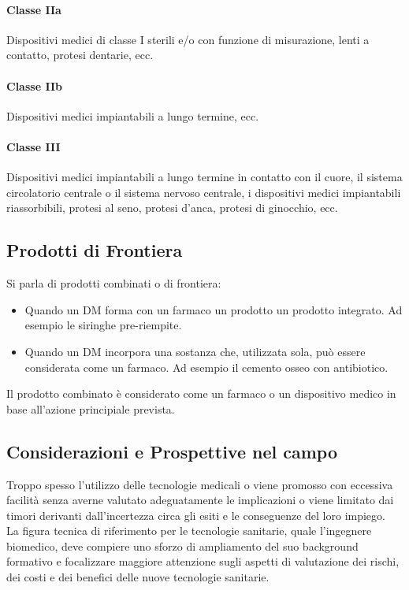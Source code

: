 \documentclass[a4paper]{article}
\begin{document}
\paragraph{Classe IIa}
Dispositivi medici di classe I sterili e/o con funzione di misurazione, lenti a 
contatto, protesi dentarie, ecc.
\paragraph{Classe IIb}
Dispositivi medici impiantabili a lungo termine, ecc.
\paragraph{Classe III}
Dispositivi medici impiantabili a lungo termine in contatto con il cuore, il 
sistema circolatorio centrale o il sistema nervoso centrale, i dispositivi 
medici impiantabili riassorbibili, protesi al seno, protesi d'anca, protesi
di ginocchio, ecc.
\subsection{Prodotti di Frontiera}
Si parla di prodotti combinati o di frontiera:
\begin{itemize}
    \item Quando un DM forma con un farmaco un prodotto un prodotto integrato.
    Ad esempio le siringhe pre-riempite.
    \item Quando un DM incorpora una sostanza che, utilizzata sola, può essere
    considerata come un farmaco. Ad esempio il cemento osseo con antibiotico.
\end{itemize}
Il prodotto combinato è considerato come un farmaco o un dispositivo medico in 
base all'azione principiale prevista.
\subsection{Considerazioni e Prospettive nel campo}
Troppo spesso l'utilizzo delle tecnologie medicali o viene promosso con
eccessiva facilità senza averne valutato adeguatamente le implicazioni o viene 
limitato dai timori derivanti dall’incertezza circa gli esiti e le conseguenze
del loro impiego. \\
La figura tecnica di riferimento per le tecnologie sanitarie, quale l’ingegnere 
biomedico, deve compiere uno sforzo di ampliamento del suo background formativo
e focalizzare maggiore attenzione sugli aspetti di valutazione dei rischi, dei 
costi e dei benefici delle nuove tecnologie sanitarie.
\end{document}

